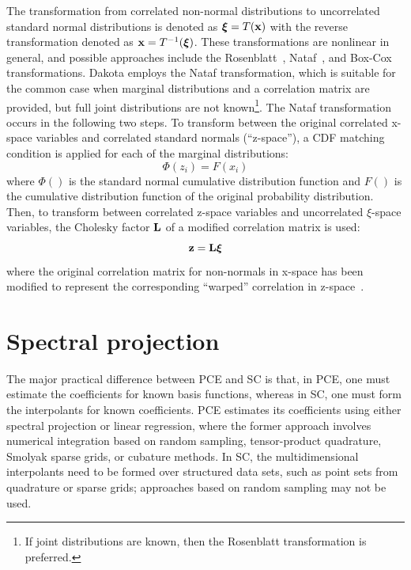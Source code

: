 The transformation from correlated non-normal distributions to
uncorrelated standard normal distributions is denoted as
$\boldsymbol{\xi} = T({\bf x})$ with the reverse transformation denoted as
${\bf x} = T^{-1}(\boldsymbol{\xi})$.  These transformations are nonlinear in
general, and possible approaches include the Rosenblatt~\cite{Ros52},
Nataf~\cite{Der86}, and Box-Cox~\cite{Box64} transformations.
Dakota employs the Nataf transformation, which is suitable for the
common case when marginal distributions and a correlation matrix are
provided, but full joint distributions are not known\footnote{If joint
  distributions are known, then the Rosenblatt transformation is
  preferred.}.  The Nataf transformation occurs in the following two
steps.  To transform between the original correlated x-space variables
and correlated standard normals (``z-space''), a CDF matching
condition is applied for each of the marginal distributions:
\begin{equation}
\Phi(z_i) = F(x_i) %
\end{equation}
where $\Phi()$ is the standard normal cumulative distribution function
and $F()$ is the cumulative distribution function of the original
probability distribution.  Then, to transform between correlated
z-space variables and uncorrelated $\xi$-space variables, the Cholesky
factor ${\bf L}$ of a modified correlation matrix is used:
\begin{equation}
{\bf z} = {\bf L} \boldsymbol{\xi} %
\end{equation}
where the original correlation matrix for non-normals in x-space has
been modified to represent the corresponding ``warped'' correlation in
z-space~\cite{Der86}.


\section{Spectral projection} \label{uq:expansion:spectral}

The major practical difference between PCE and SC is that, in PCE, one
must estimate the coefficients for known basis functions, whereas in
SC, one must form the interpolants for known coefficients.  PCE
estimates its coefficients using either spectral projection or linear
regression, where the former approach involves numerical integration
based on random sampling, tensor-product quadrature, Smolyak sparse
grids, or cubature methods.  In SC, the multidimensional interpolants
need to be formed over structured data sets, such as point sets from
quadrature or sparse grids; approaches based on random sampling may
not be used.  

